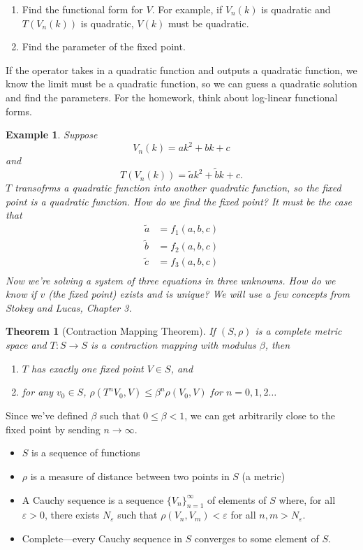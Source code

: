 \documentclass[11pt]{article}
\newtheorem*{example}{Example}
\newtheorem*{theorem}{Theorem}
\begin{document}
\begin{enumerate}
\item Find the functional form for $V$. For example, if $V_n(k)$ is quadratic and $T(V_n(k))$ is quadratic, $V(k)$ must be quadratic.
\item Find the parameter of the fixed point.
\end{enumerate}

If the operator takes in a quadratic function and outputs a quadratic function, we know the limit must be a quadratic function, so we can guess a quadratic solution and find the parameters. For the homework, think about log-linear functional forms.

\begin{example}
Suppose
\[
V_n(k) = ak^2 + bk + c
\]
and
\[
T(V_n(k)) = \tilde{a}k^2 + \tilde{b}k + c.
\]
$T$ transofrms a quadratic function into another quadratic function, so the fixed point is a quadratic function. How do we find the fixed point? It must be the case that
\begin{align*}
\tilde{a} &= f_1(a, b, c)\\
\tilde{b} &= f_2(a, b, c)\\
\tilde{c} &= f_3(a, b, c)\\
\end{align*}
Now we're solving a system of three equations in three unknowns. How do we know if $v$ (the fixed point) exists and is unique? We will use a few concepts from Stokey and Lucas, Chapter 3.
\end{example}

\begin{theorem}[Contraction Mapping Theorem]
If $(S, \rho)$ is a complete metric space and $T: S \to S$ is a contraction mapping with modulus $\beta$, then
\begin{enumerate}
\item $T$ has exactly one fixed point $V \in S$, and
\item for any $v_0 \in S$, $\rho(T^nV_0, V) \le \beta^n \rho (V_0, V)$ for $n = 0, 1, 2 \ldots$
\end{enumerate}
\end{theorem}
Since we've defined \(\beta\) such that \(0 \le \beta < 1\), we can get arbitrarily close to the fixed point by sending \(n \to \infty\).

\begin{itemize}
\item $S$ is a sequence of functions
\item $\rho$ is a measure of distance between two points in $S$ (a metric)
\item A Cauchy sequence is a sequence $\{V_n\}^\infty_{n = 1}$ of elements of $S$ where, for all $\varepsilon > 0$, there exists $N_\varepsilon$ such that $\rho(V_n, V_m) < \varepsilon$ for all $n, m > N_\varepsilon$.
\item Complete---every Cauchy sequence in $S$ converges to some element of $S$.
\end{itemize}
\end{document}
